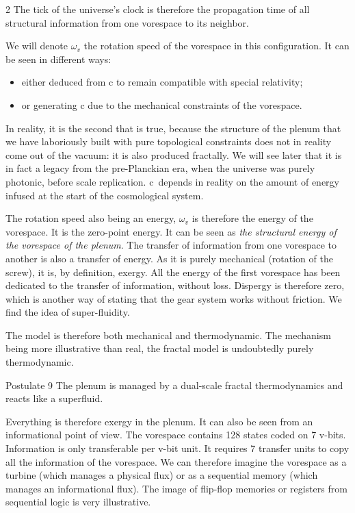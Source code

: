 \begin{multicols}{2}
	The tick of the universe's clock is therefore the propagation time of 
	all structural information from one vorespace to its neighbor.
	
	We will denote $\omega_v$ the rotation speed of the vorespace in this 
	configuration. It can be seen in different ways:
	
	\begin{itemize}
		\item either deduced from c to remain compatible with special 
		relativity;
		\item or generating c due to the mechanical constraints of the 
		vorespace.
	\end{itemize}
	
	In reality, it is the second that is true, because the structure of the plenum 
	that we have laboriously built with pure topological constraints 
	does not in reality come out of the vacuum: it is also produced 
	fractally. We will see later that it is in fact a 
	legacy from the pre-Planckian era, when the universe was purely 
	photonic, before scale replication. c\, depends in reality on 
	the amount of energy infused at the start of the cosmological system.
	\medskip
	
	The rotation speed also being an energy, $\omega_v$ is therefore 
	the energy of the vorespace. It is the zero-point energy. It can 
	be seen as \textit{the structural energy of the vorespace of the plenum}. 
	The transfer of information from one vorespace to another is also a 
	transfer of energy. As it is purely mechanical (rotation of the 
	screw), it is, by definition, exergy. All the energy of the 
	first vorespace has been dedicated to the transfer of information, without 
	loss. Dispergy is therefore zero, which is another way 
	of stating that the gear system works without friction. We 
	find the idea of super-fluidity.
	
	The model is therefore both mechanical and thermodynamic. The 
	mechanism being more illustrative than real, the fractal model is 
	undoubtedly purely thermodynamic.
	
	\begin{mybox}[breakable,colback=blue!10, colbacktitle=pkcolor]{Postulate 9}
		The plenum is managed by a dual-scale fractal thermodynamics and 
		reacts like a superfluid.
	\end{mybox}
	\medskip
	
	Everything is therefore exergy in the plenum. It can also be seen from 
	an informational point of view. The vorespace contains 128 states coded on 
	7 v-bits. Information is only transferable per v-bit unit. It 
	requires 7 transfer units to copy all the information of the 
	vorespace. We can therefore imagine the vorespace as a turbine (which 
	manages a physical flux) or as a sequential memory (which manages an 
	informational flux). The image of flip-flop memories or registers from 
	sequential logic is very illustrative.
	\medskip
	

\end{multicols}
